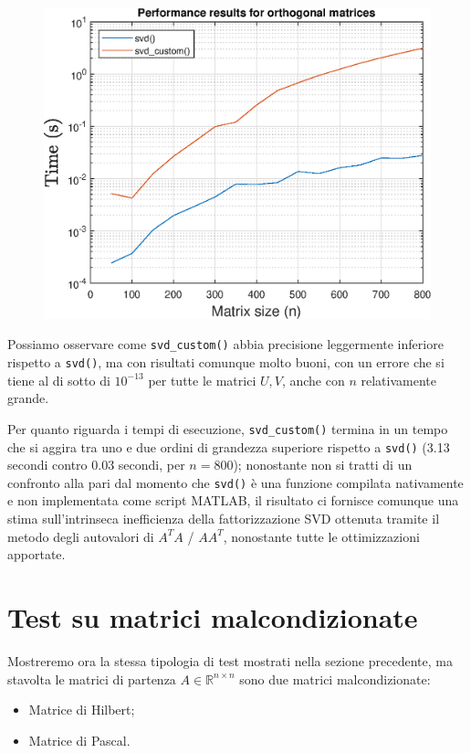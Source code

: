 \begin{figure}[!htb]
\includegraphics[width=\linewidth]{imgs/03_-_Performance_results_for_orthogonal_matrices.eps}
\endminipage
\end{figure}

Possiamo osservare come \texttt{svd\_custom()} abbia precisione leggermente 
inferiore rispetto a \texttt{svd()}, ma con risultati comunque molto buoni, con 
un errore che si tiene al di sotto di $10^{-13}$ per tutte le matrici $U,V$, 
anche con $n$ relativamente grande.

Per quanto riguarda i tempi di esecuzione, \texttt{svd\_custom()} termina in un 
tempo che si aggira tra uno e due ordini di grandezza superiore rispetto a 
\texttt{svd()} (3.13 secondi contro 0.03 secondi, per $n = 800$); nonostante non 
si tratti di un confronto alla pari dal momento che \texttt{svd()} è una 
funzione compilata nativamente e non implementata come script MATLAB, il 
risultato ci fornisce comunque una stima sull'intrinseca inefficienza della 
fattorizzazione SVD ottenuta tramite il metodo degli autovalori di
$A^T A$ / $A A^T$, nonostante tutte le ottimizzazioni apportate.


\newpage
\section{Test su matrici malcondizionate}
Mostreremo ora la stessa tipologia di test mostrati nella sezione precedente, ma 
stavolta le matrici di partenza $A \in \mathbb{R}^{n \times n}$ sono due matrici 
malcondizionate:
\begin{itemize}
	\item Matrice di Hilbert;
	\item Matrice di Pascal.
\end{itemize}

